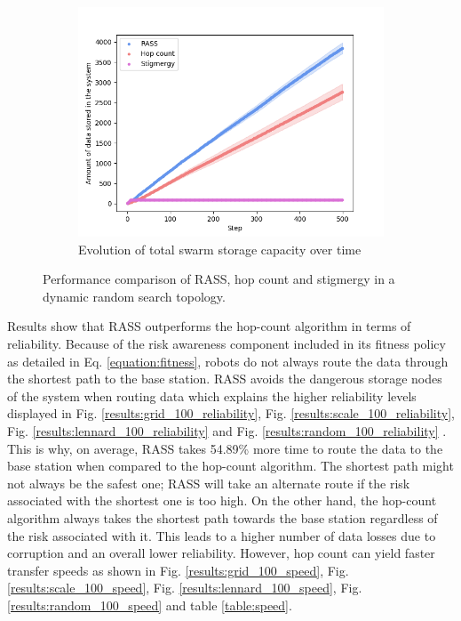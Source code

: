 \documentclass[sigconf]{aamas}
\begin{document}
\begin{figure}
\begin{subfigure}{0.30\textwidth}
        \includegraphics[width=\textwidth]{figures/random_storage.png}
        \caption{Evolution of total swarm storage capacity over time}
        \label{results:random_100_storage}
    \end{subfigure}
    \caption{Performance comparison of RASS, hop count and stigmergy in a dynamic random search topology.}
    \label{results:dynamicTopologyRandom}
    \vspace{-2mm}
\end{figure}

Results show that RASS outperforms the hop-count algorithm in terms of reliability. Because 
of the risk awareness component included in its fitness policy as detailed in Eq. 
\ref{equation:fitness}, robots do not always route the data through the shortest path to 
the base station. RASS avoids the dangerous storage nodes of the system when routing data 
which explains the higher reliability levels displayed in Fig. 
\ref{results:grid_100_reliability}, Fig. \ref{results:scale_100_reliability}, Fig. 
\ref{results:lennard_100_reliability} and Fig. \ref{results:random_100_reliability} . This 
is why, on average, RASS takes 54.89\% more time to route the data to the base station when 
compared to the hop-count algorithm. The shortest path might not always be the safest one; 
RASS will take an alternate route if the risk associated with the shortest one is too high. 
On the other hand, the hop-count algorithm always takes the shortest path towards the base 
station regardless of the risk associated with it. This leads to a higher number of data 
losses due to corruption and an overall lower reliability.
However, hop count can yield faster transfer speeds as shown in Fig. \ref{results:grid_100_speed}, Fig. \ref{results:scale_100_speed}, Fig. \ref{results:lennard_100_speed}, Fig. \ref{results:random_100_speed} and table \ref{table:speed}.
\end{document}
